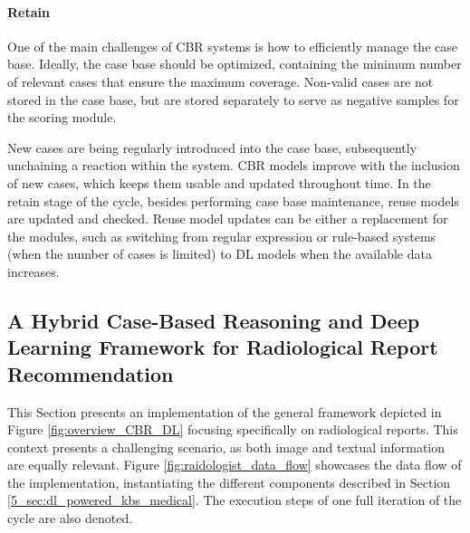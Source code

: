 \paragraph{Retain}\label{5_sec:dl_powered_cbr_retain}
One of the main challenges of CBR systems is how to efficiently manage the case base. Ideally, the case base should be optimized, containing the minimum number of relevant cases that ensure the maximum coverage. Non-valid cases are not stored in the case base, but are stored separately to serve as negative samples for the scoring module. 

New cases are being regularly introduced into the case base, subsequently unchaining a reaction within the system. CBR models improve with the inclusion of new cases, which keeps them usable and updated throughout time. In the retain stage of the cycle, besides performing case base maintenance, reuse models are updated and checked. Reuse model updates can be either a replacement for the modules, such as switching from regular expression or rule-based systems (when the number of cases is limited) to DL models when the available data increases. 

\subsection{A Hybrid Case-Based Reasoning and Deep Learning Framework for Radiological Report Recommendation}\label{5_sec:raidologist}

This Section presents an implementation of the general framework depicted in Figure \ref{fig:overview_CBR_DL} focusing specifically on radiological reports. This context presents a challenging scenario, as both image and textual information are equally relevant. Figure \ref{fig:raidologist_data_flow} showcases the data flow of the implementation, instantiating the different components described in Section \ref{5_sec:dl_powered_kbs_medical}. The execution steps of one full iteration of the cycle are also denoted.

